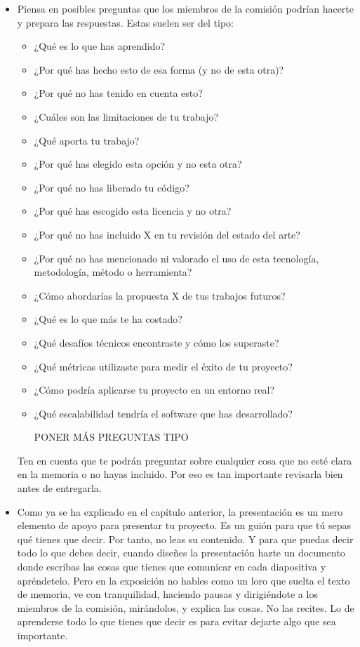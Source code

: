 \begin{itemize}
    \item Piensa en posibles preguntas que los miembros de la comisión podrían hacerte y prepara las respuestas. Estas suelen ser del tipo:

    \begin{itemize}
        \item ¿Qué es lo que has aprendido?
        \item ¿Por qué has hecho esto de esa forma (y no de esta otra)?
        \item ¿Por qué no has tenido en cuenta esto?
        \item ¿Cuáles son las limitaciones de tu trabajo?
        \item ¿Qué aporta tu trabajo?
        \item ¿Por qué has elegido esta opción y no esta otra?
        \item ¿Por qué no has liberado tu código? 
        \item ¿Por qué has escogido esta licencia y no otra?
        \item ¿Por qué no has incluido X en tu revisión del estado del arte?
        \item ¿Por qué no has mencionado ni valorado el uso de esta tecnología, metodología, método o herramienta?
        \item ¿Cómo abordarías la propuesta X de tus trabajos futuros? 
        \item ¿Qué es lo que más te ha costado?
        \item ¿Qué desafíos técnicos encontraste y cómo los superaste?
        \item ¿Qué métricas utilizaste para medir el éxito de tu proyecto?
        \item ¿Cómo podría aplicarse tu proyecto en un entorno real?
        \item ¿Qué escalabilidad tendría el software que has desarrollado?
        \item [PONER MÁS PREGUNTAS TIPO]
    \end{itemize}

    Ten en cuenta que te podrán preguntar sobre cualquier cosa que no esté clara en la memoria o no hayas incluido. Por eso es tan importante revisarla bien antes de entregarla. 

    \item Como ya se ha explicado en el capítulo anterior, la presentación es un mero elemento de apoyo para presentar tu proyecto. Es un guión para que tú sepas qué tienes que decir. Por tanto, no leas su contenido. Y para que puedas decir todo lo que debes decir, cuando diseñes la presentación hazte un documento donde escribas las cosas que tienes que comunicar en cada diapositiva y apréndetelo. Pero en la exposición no hables como un loro que suelta el texto de memoria, ve con tranquilidad, haciendo pausas y dirigiéndote a los miembros de la comisión, mirándolos, y explica las cosas. No las recites. Lo de aprenderse todo lo que tienes que decir es para evitar dejarte algo que sea importante. 


\end{itemize}
